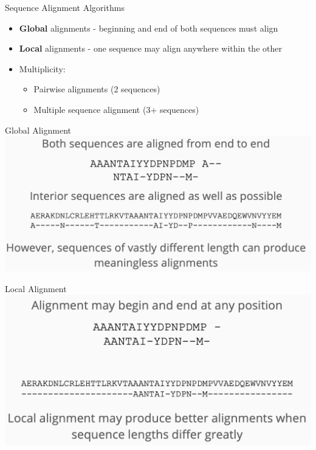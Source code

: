 \documentclass[
  ignorenonframetext,
]{beamer}
\providecommand{\tightlist}{%
  \setlength{\itemsep}{0pt}\setlength{\parskip}{0pt}}
\begin{document}
\begin{frame}{Sequence Alignment Algorithms}
\label{sequence-alignment-algorithms}
\Large

\begin{itemize}
\tightlist
\item
  \textbf{Global} alignments - beginning and end of both sequences must
  align
\item
  \textbf{Local} alignments - one sequence may align anywhere within the
  other
\item
  Multiplicity:

  \begin{itemize}
  \tightlist
  \item
    Pairwise alignments (2 sequences)
  \item
    Multiple sequence alignment (3+ sequences)
  \end{itemize}
\end{itemize}
\end{frame}

\begin{frame}{Global Alignment}
\label{global-alignment}
\includegraphics{figs/global_align.png}
\end{frame}

\begin{frame}{Local Alignment}
\label{local-alignment}
\includegraphics{figs/local_align.png}
\end{frame}
\end{document}
